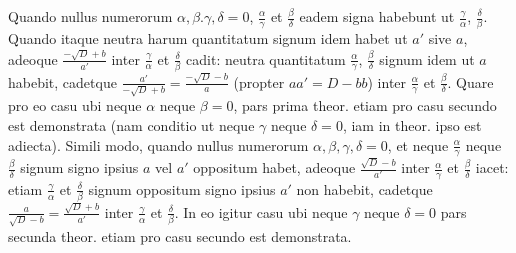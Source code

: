 Quando nullus numerorum $\alpha,\beta.\gamma,\delta=0$, $\frac{\alpha}{\gamma}$ et $\frac{\beta}{\delta}$ eadem signa habebunt ut $\frac{\gamma}{\alpha}$, $\frac{\delta}{\beta}$. Quando itaque neutra harum quantitatum signum idem habet ut $a'$ sive $a$, adeoque $\frac{-\surd D+b}{a'}$ inter $\frac{\gamma}{\alpha}$ et $\frac{\delta}{\beta}$ cadit: neutra quantitatum $\frac{\alpha}{\gamma}$, $\frac{\beta}{\delta}$ signum idem ut $a$ habebit, cadetque $\frac{a'}{-\surd D+b}=\frac{-\surd D-b}{a}$ (propter $aa'=D-bb$) inter $\frac{\alpha}{\gamma}$ et $\frac{\beta}{\delta}$. Quare pro eo casu ubi neque $\alpha$ neque $\beta=0$, pars prima theor. etiam pro casu secundo est demonstrata (nam conditio ut neque $\gamma$ neque $\delta=0$, iam in theor. ipso est adiecta). Simili modo, quando nullus numerorum $\alpha,\beta,\gamma,\delta=0$,
et neque $\frac{\alpha}{\gamma}$ neque $\frac{\beta}{\delta}$ signum signo ipsius $a$ vel $a'$ oppositum habet, adeoque ${\frac{\surd D-b}{a'}}$ inter $\frac{\alpha}{\gamma}$ et $\frac{\beta}{\delta}$ iacet: etiam $\frac{\gamma}{\alpha}$ et $\frac{\delta}{\beta}$ signum oppositum signo ipsius $a'$ non habebit, cadetque $\frac{a}{\surd D-b}=\frac{\surd D+b}{a'}$ inter $\frac{\gamma}{\alpha}$ et $\frac{\delta}{\beta}$. In eo igitur casu ubi neque $\gamma$ neque $\delta=0$ pars secunda theor. etiam pro casu {secundo} est demonstrata.

